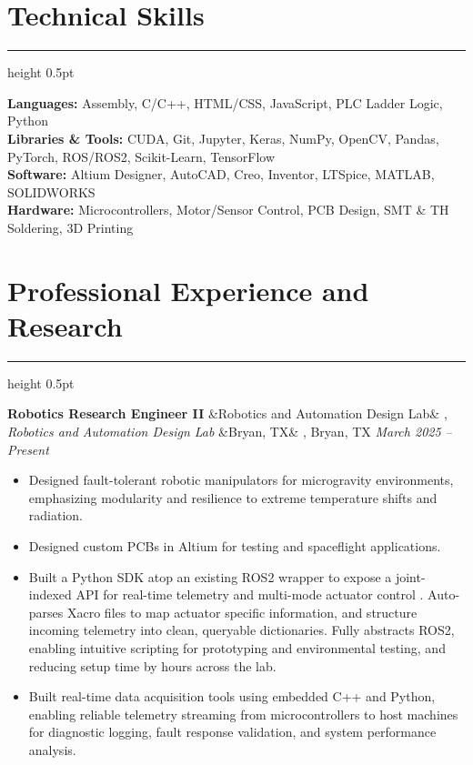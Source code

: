 \documentclass[letterpaper,10pt]{article}
\newcommand{\heading}[1]{%
    \vspace{-5mm} %
    \section*{#1}%
    \vspace{-3mm}%
    \noindent\hrule height 0.5pt %
    \vspace{4mm}%
}
\newcommand{\experience}[5]{%
    \noindent\textbf{#1}%
    \ifx&#2&
    \else
        , \textit{#2}%
    \fi
    \ifx&#3&
    \else
        , #3%
    \fi
    \hfill \textit{#4} \\
    \vspace{-6.8mm}%
    \begin{itemize}[itemsep=-5pt]
        \setlength{\itemindent}{0em}
        #5
    \end{itemize}
    \vspace{1mm}
}
\begin{document}
\heading{Technical Skills}
\vspace{-1mm}%
\noindent\textbf{Languages:} Assembly, C/C++, HTML/CSS, JavaScript, PLC Ladder Logic, Python \\
\textbf{Libraries \& Tools:} CUDA, Git, Jupyter, Keras, NumPy, OpenCV, Pandas, PyTorch, ROS/ROS2, Scikit-Learn, TensorFlow \\
\textbf{Software:} Altium Designer, AutoCAD, Creo, Inventor, LTSpice, MATLAB, SOLIDWORKS \\
\textbf{Hardware:} Microcontrollers, Motor/Sensor Control, PCB Design, SMT \& TH Soldering, 3D Printing \\


\heading{Professional Experience and Research}

\experience
    {Robotics Research Engineer II}
    {Robotics and Automation Design Lab}
    {Bryan, TX}
    {March 2025 – Present}
    {
        \item Designed fault-tolerant robotic manipulators for microgravity environments, emphasizing modularity and resilience to extreme temperature shifts and radiation.
        \item Designed custom PCBs in Altium for testing and spaceflight applications.
        \item Built a Python SDK atop an existing ROS2 wrapper to expose a joint-indexed API for real-time telemetry and multi-mode actuator control . Auto-parses Xacro files to map actuator specific information, and structure incoming telemetry into clean, queryable dictionaries. Fully abstracts ROS2, enabling intuitive scripting for prototyping and environmental testing, and reducing setup time by hours across the lab.
        \item Built real-time data acquisition tools using embedded C++ and Python, enabling reliable telemetry streaming from microcontrollers to host machines for diagnostic logging, fault response validation, and system performance analysis.

    }
\end{document}
